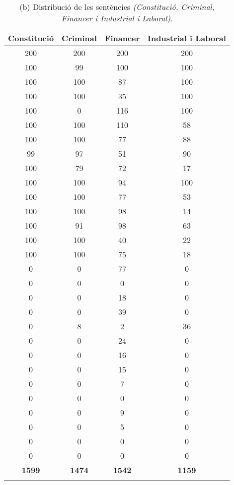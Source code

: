 \begin{table}[H]
\centering
\begin{tabular}{cccc}
  \Xhline{2\arrayrulewidth}
  \textbf{Constitució} &
  \textbf{Criminal} &
  \textbf{Financer} &
  \textbf{Industrial i Laboral} \\
  \hline
200 & 200 & 200 & 200 \\
100 & 99 & 100 & 100 \\
100 & 100 & 87 & 100 \\
100 & 100 & 35 & 100 \\
100 & 0 & 116 & 100 \\
100 & 100 & 110 & 58 \\
100 & 100 & 77 & 88 \\
99 & 97 & 51 & 90 \\
100 & 79 & 72 & 17 \\
100 & 100 & 94 & 100 \\
100 & 100 & 77 & 53 \\
100 & 100 & 98 & 14 \\
100 & 91 & 98 & 63 \\
100 & 100 & 40 & 22 \\
100 & 100 & 75 & 18 \\
0 & 0 & 77 & 0 \\
0 & 0 & 0 & 0 \\
0 & 0 & 18 & 0 \\
0 & 0 & 39 & 0 \\
0 & 8 & 2 & 36 \\
0 & 0 & 24 & 0 \\
0 & 0 & 16 & 0 \\
0 & 0 & 15 & 0 \\
0 & 0 & 7 & 0 \\
0 & 0 & 0 & 0 \\
0 & 0 & 9 & 0 \\
0 & 0 & 5 & 0 \\
0 & 0 & 0 & 0 \\
0 & 0 & 0 & 0 \\
\hline
\textbf{1599} & \textbf{1474} & \textbf{1542} & \textbf{1159} \\
\Xhline{2\arrayrulewidth}
\end{tabular}
\captionsetup{font=small}
\caption*{(b) Distribució de les sentències \textit{(Constitució, Criminal, Financer i Industrial i Laboral)}.}
\end{table}

\pagebreak
  
